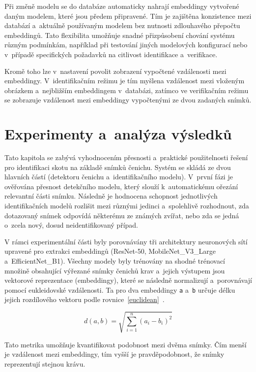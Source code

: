 Při změně modelu se do databáze automaticky nahrají embeddingy vytvořené daným modelem, které jsou předem připravené. Tím je zajištěna konzistence mezi databází a~aktuálně používaným modelem bez nutnosti zdlouhavého přepočtu embeddingů. Tato flexibilita umožňuje snadné přizpůsobení chování systému různým podmínkám, například při testování jiných modelových konfigurací nebo v~případě specifických požadavků na citlivost identifikace a~verifikace.

Kromě toho lze v~nastavení povolit zobrazení vypočtené vzdálenosti mezi embeddingy. V~identifikačním režimu je tím myšlena vzdálenost mezi vloženým obrázkem a~nejbližším embeddingem v~databázi, zatímco ve verifikačním režimu se zobrazuje vzdálenost mezi embeddingy vypočtenými ze dvou zadaných snímků.

\chapter{Experimenty a~analýza výsledků}
\label{kap5}
Tato kapitola se zabývá vyhodnocením přesnosti a~praktické použitelnosti řešení pro identifikaci skotu na základě snímků čenichu. Systém se skládá ze dvou hlavních částí (detektoru čenichu a~identifikačního modelu). V~první fázi je ověřována přesnost detekčního modelu, který slouží k~automatickému ořezání relevantní části snímku. Následně je hodnocena schopnost jednotlivých identifikačních modelů rozlišit mezi různými jedinci a~spolehlivě rozhodnout, zda dotazovaný snímek odpovídá některému ze známých zvířat, nebo zda se jedná o~zcela nový, dosud neidentifikovaný případ.

V rámci experimentální části byly porovnávány tři architektury neuronových sítí upravené pro extrakci embeddingů (ResNet-50, MobileNet\_V3\_Large a~EfficientNet\_B1). \linebreak Všechny modely byly trénovány na shodné trénovací množině obsahující výřezané snímky čenichů krav a~jejich výstupem jsou vektorové reprezentace (embeddingy), které se následně normalizují a~porovnávají pomocí eukleidovské vzdálenosti. Ta pro dva embeddingy \texttt{a} a~\texttt{b} určuje délku jejich rozdílového vektoru podle rovnice~\ref{euclidean}~\cite{Precision}.

\begin{equation}
	d(a, b) = \sqrt{\sum_{i=1}^{n} (a_i - b_i)^2}
	\label{euclidean}
\end{equation}

Tato metrika umožňuje kvantifikovat podobnost mezi dvěma snímky. Čím menší je vzdálenost mezi embeddingy, tím vyšší je pravděpodobnost, že snímky reprezentují stejnou krávu.

